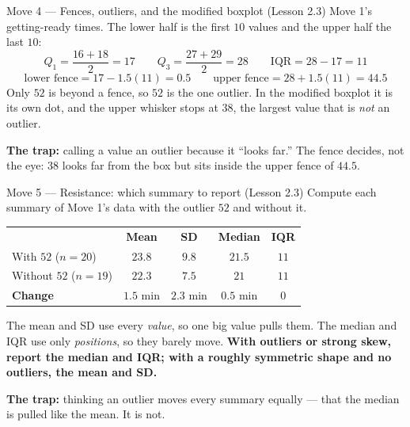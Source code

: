 \documentclass[10pt]{article}
\newcommand{\drawbox}[7]{%
  \draw[charcoal, thick] (#2,#1) -- (#3,#1);
  \draw[charcoal, thick] (#5,#1) -- (#6,#1);
  \draw[charcoal, thick] (#2,#1-0.15) -- (#2,#1+0.15);
  \draw[charcoal, thick] (#6,#1-0.15) -- (#6,#1+0.15);
  \filldraw[fill=frost, draw=cerulean, thick] (#3,#1-0.3) rectangle (#5,#1+0.3);
  \draw[cerulean, very thick] (#4,#1-0.3) -- (#4,#1+0.3);
  \node[left, font=\small\bfseries] at (#2-0.2,#1) {#7};}
\begin{document}
\vspace{3pt}
\boxguard[22]
\begin{notesbox}{Move 4 --- Fences, outliers, and the modified boxplot (Lesson 2.3)}
\small
Move 1's getting-ready times. The lower half is the first $10$ values and the upper half the
last $10$:
\[ Q_1 = \frac{16 + 18}{2} = 17 \qquad Q_3 = \frac{27 + 29}{2} = 28 \qquad
   \text{IQR} = 28 - 17 = 11 \]
\[ \text{lower fence} = 17 - 1.5(11) = 0.5 \qquad \text{upper fence} = 28 + 1.5(11) = 44.5 \]
Only $52$ is beyond a fence, so $52$ is the one outlier. In the modified boxplot it is its own
dot, and the upper whisker stops at $38$, the largest value that is \emph{not} an outlier.

\vspace{3pt}
\begin{center}
\end{center}

\textbf{The trap:} calling a value an outlier because it ``looks far.'' The fence decides, not
the eye: $38$ looks far from the box but sits inside the upper fence of $44.5$.
\end{notesbox}

\vspace{3pt}
\boxguard[18]
\begin{notesbox}{Move 5 --- Resistance: which summary to report (Lesson 2.3)}
\small
Compute each summary of Move 1's data with the outlier $52$ and without it.

\vspace{3pt}
\renewcommand{\arraystretch}{1.2}
\begin{tabularx}{\linewidth}{@{} X c c c c @{}}
\rowcolor{frost}
 & \textbf{Mean} & \textbf{SD} & \textbf{Median} & \textbf{IQR} \\
With $52$ ($n = 20$) & $23.8$ & $9.8$ & $21.5$ & $11$ \\
Without $52$ ($n = 19$) & $22.3$ & $7.5$ & $21$ & $11$ \\
\textbf{Change} & $1.5$ min & $2.3$ min & $0.5$ min & $0$ \\
\end{tabularx}

\vspace{3pt}
The mean and SD use every \emph{value}, so one big value pulls them. The median and IQR use
only \emph{positions}, so they barely move. \textbf{With outliers or strong skew, report the
median and IQR; with a roughly symmetric shape and no outliers, the mean and SD.}

\vspace{2pt}
\textbf{The trap:} thinking an outlier moves every summary equally --- that the median is
pulled like the mean. It is not.
\end{notesbox}
\end{document}
